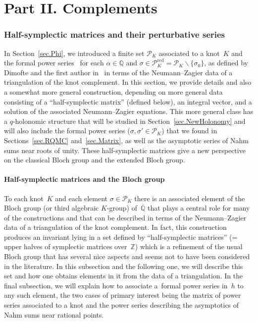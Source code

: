 \documentclass[pdftex]{sigma}
\numberwithin{equation}{section}
\def\calP{\mathcal P}
\def\calP{\mathcal P}
\def\a{\alpha}
\def\Z{\mathbb Z}
\def\Q{\mathbb Q}
\def\a{\alpha}
\def\s{\sigma}
\def\Qbar{\overline{\Q}}
\def\ssm{\smallsetminus}
\def\RED{^{\text{red}}}
\def\calPx{\mathcal{P}\RED} %
\begin{document}
\part*{Part II. Complements}

\section{Half-symplectic matrices and their perturbative series}\label{sec.perturbation}

In Section~\ref{sec.Phi}, we introduced a finite set $\calP_K$ associated to a
knot~$K$ and the formal power series~\smash{$\Phi_\a^{(K,\s)}(h)$} for each $\a\in\Q$ and
$\s\in\calPx_K=\calP_K\ssm\{\s_0\}$, as defined by Dimofte and the first author
in~\cite{DG,DG2} in terms of the Neumann--Zagier data of a triangulation of
the knot complement. In this section, we provide details and also a somewhat more
general construction, depending on more general data consisting of a
``half-symplectic matrix'' (defined below), an integral vector, and a solution of the
associated Neumann--Zagier equations. This more general class has a $q$-holonomic
structure that will be studied in Section~\ref{sec.NewHolonomy} and will also include
the formal power series \smash{$\Phi_\a^{(K,\s,\s')}(h)$} ($\s,\s'\in\calP_K$) that we found in
Sections~\ref{sec.RQMC} and~\ref{sec.Matrix}, as well as the asymptotic series
of Nahm sums near roots of unity. These half-symplectic matrices give a new perspective
on the classical Bloch group and the extended Bloch group.

\subsection{Half-symplectic matrices and the Bloch group}
\label{sub.HalfSymplectic}

To each knot~$K$ and each element $\s\in\calP_K$ there is an associated element of the
Bloch group (or third algebraic $K$-group) of~$\Qbar$ that plays a central role for
many of the constructions and that can be described in terms of the Neumann--Zagier data
of a triangulation of the knot complement. In fact, this construction produces an
invariant lying in a set defined by ``half-symplectic matrices'' (= upper halves of
symplectic matrices over~$\Z$) which is a refinement of the usual Bloch group that has
several nice aspects and seems not to have been considered in the literature.
In this subsection and the following one, we will describe this set and how one obtains
elements in it from the data of a triangulation. In the final subsection, we will
explain how to associate a~formal power series in~$h$ to any such element, the two
cases of primary interest being the matrix of power series \smash{$\Phi_\a^{(K,\s,\s')}(h)$}
associated to a knot and the power series describing the asymptotics of Nahm sums
near rational points.
\end{document}
